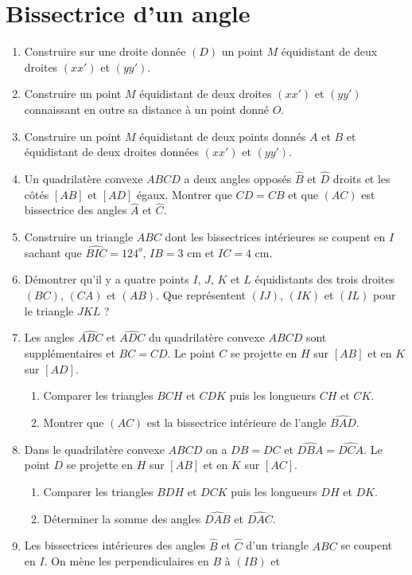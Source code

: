 \documentclass[12 pt]{report}
\theoremstyle{plain}
\newcounter{n}
\begin{document}
\chapter{Bissectrice d'un angle}
\begin{enumerate}
\item Construire sur une droite donnée $(D)$ un point $M$ équidistant de deux droites
$(xx')$ et $(yy')$.
\item Construire un point $M$ équidistant de deux droites $(xx')$ et $(yy')$ connaissant en outre sa distance à un point donné $O$. 
\item Construire un point $M$ équidistant de deux points donnés $A$ et $B$ et 
équidistant de deux droites données $(xx')$ et $(yy')$.
\item Un quadrilatère convexe $ABCD$ a deux angles opposés $\widehat{B}$ et $\widehat{D}$ droits et les côtés $[AB]$ et $[AD]$ égaux. Montrer que $CD=CB$
et que $(AC)$ est bissectrice des angles $\widehat{A}$ et $\widehat{C}$. 
\item Construire un triangle $ABC$ dont les bissectrices intérieures
se coupent en $I$ sachant que $\widehat{BIC}=124^o$, $IB=3$ cm et $IC = 4$ cm.
\item Démontrer qu'il y a quatre points $I$, $J$, $K$ et $L$ équidistants des trois droites $(BC)$, $(CA)$ et $(AB)$. Que représentent $(IJ)$, $(IK)$ et $(IL)$ pour
le triangle $JKL$ ?
\item Les angles $\widehat{ABC}$ et $\widehat{ADC}$ du quadrilatère convexe $ABCD$ 
sont supplémentaires et $BC=CD$. Le point $C$ se projette en $H$ sur $[AB]$ et en 
$K$ sur $[AD]$. \begin{enumerate}
\item Comparer les triangles $BCH$ et $CDK$ puis les longueurs $CH$ et $CK$.
\item Montrer que $(AC)$ est la bissectrice intérieure de l'angle $\widehat{BAD}$.
\end{enumerate}
\item Dans le quadrilatère convexe $ABCD$ on a $DB=DC$ et $\widehat{DBA}=\widehat{DCA}$. Le point $D$ se projette en $H$ sur $[AB]$ et en $K$ sur $[AC]$.
\begin{enumerate}
\item Comparer les triangles $BDH$ et $DCK$ puis les longueurs $DH$ et $DK$. 
\item Déterminer la somme des angles $\widehat{DAB}$ et $\widehat{DAC}$.
\end{enumerate}
\item Les bissectrices intérieures des angles $\widehat{B}$ et $\widehat{C}$ d'un triangle $ABC$ se coupent en $I$. On mène les perpendiculaires en $B$ à $(IB)$ et 

\end{enumerate}
\end{document}
